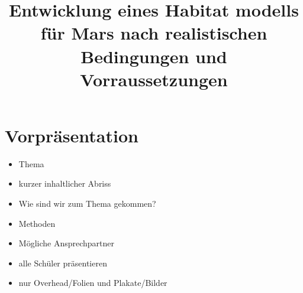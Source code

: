 \documentclass[12pt]{article}
\title{Entwicklung eines Habitat  modells für Mars nach realistischen Bedingungen und Vorraussetzungen}
\begin{document}


\newpage

\maketitle

\medskip

\tableofcontents

\newpage

\section*{\textbf{Vorpräsentation}}
\begin{itemize}
  \item Thema
  \item kurzer inhaltlicher Abriss
  \item Wie sind wir zum Thema gekommen?
  \item Methoden
  \item Mögliche Ansprechpartner
  \item alle Schüler präsentieren
  \item nur Overhead/Folien und Plakate/Bilder
\end{itemize}
\end{document}

